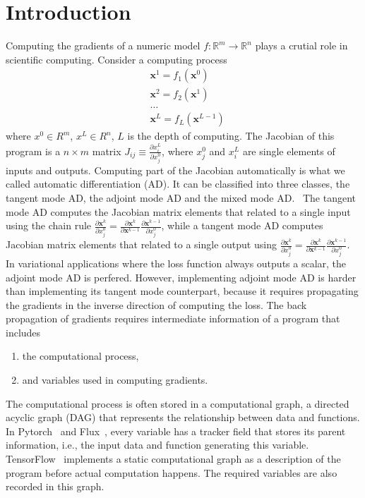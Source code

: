 \documentclass[aps,twocolumn,longbibliography,english,superscriptaddress]{revtex4-1}
\newcommand{\<}{\langle}
\renewcommand{\>}{\rangle}
\newcommand{\vx}{{\mathbf{x}}}
\theoremstyle{definition}\newtheorem{definition}{\textit{Definition}}
\begin{document}
\section{Introduction}\label{sec:intro}
    Computing the gradients of a numeric model $f : \mathbb{R}^m \rightarrow \mathbb{R}^n$ plays a crutial role in scientific computing. Consider a computing process
\begin{align*}
    &\vx^1 = f_1(\vx^0)\\
    &\vx^2 = f_2(\vx^1)\\
    &\ldots\\
    &\vx^L = f_L(\vx^{L-1})
\end{align*}
where $x^0\in R^m$, $x^L\in R^n$, $L$ is the depth of computing.
The Jacobian of this program is a $n\times m$ matrix $J_{ij} \equiv \frac{\partial x^L_i}{\partial x_j^0}$, where $x_j^0$ and $x_i^L$ are single elements of inputs and outputs.
Computing part of the Jacobian automatically is what we called automatic differentiation (AD). It can be classified into three classes, the tangent mode AD, the adjoint mode AD and the mixed mode AD.~\cite{Hascoet2013}
The tangent mode AD computes the Jacobian matrix elements that related to a single input using the chain rule $\frac{\partial \vx^k}{\partial x^0_j} = \frac{\partial \vx^k}{\partial \vx^{k-1}}\frac{\partial \vx^{k-1}}{\partial x^0_j}$, while a tangent mode AD computes Jacobian matrix elements that related to a single output using $\frac{\partial \vx^k}{\partial x^0_j} = \frac{\partial \vx^k}{\partial \vx^{k-1}}\frac{\partial \vx^{k-1}}{\partial x^0_j}$.
    In variational applications where the loss function always outputs a scalar, the adjoint mode AD is perfered.
However, implementing adjoint mode AD is harder than implementing its tangent mode counterpart, because it requires propagating the gradients in the inverse direction of computing the loss. The back propagation of gradients requires intermediate information of a program that includes
\begin{enumerate}
    \item the computational process,
    \item and variables used in computing gradients.
\end{enumerate}
    The computational process is often stored in a computational graph, a directed acyclic graph (DAG) that represents the relationship between data and functions. In Pytorch~\cite{Paszke2017} and Flux~\cite{Innes2018a}, every variable has a tracker field that stores its parent information, i.e., the input data and function generating this variable. TensorFlow~\cite{Tensorflow2015} implements a static computational graph as a description of the program before actual computation happens. The required variables are also recorded in this graph.
\end{document}
